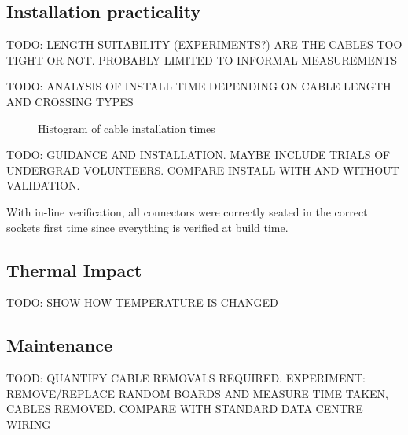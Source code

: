 		\subsection{Installation practicality}
			
			TODO: LENGTH SUITABILITY (EXPERIMENTS?) ARE THE CABLES TOO TIGHT OR NOT.
			PROBABLY LIMITED TO INFORMAL MEASUREMENTS
			
			TODO: ANALYSIS OF INSTALL TIME DEPENDING ON CABLE LENGTH AND CROSSING
			TYPES
			\begin{figure}
				
				\caption{Histogram of cable installation times}
			\end{figure}
			
			TODO: GUIDANCE AND INSTALLATION. MAYBE INCLUDE TRIALS OF UNDERGRAD
			VOLUNTEERS. COMPARE INSTALL WITH AND WITHOUT VALIDATION.
			
			With in-line verification, all connectors were correctly seated in the
			correct sockets first time since everything is verified at build time.
		
		\subsection{Thermal Impact}
			
			TODO: SHOW HOW TEMPERATURE IS CHANGED
			
		\subsection{Maintenance}
			
			TOOD: QUANTIFY CABLE REMOVALS REQUIRED. EXPERIMENT: REMOVE/REPLACE RANDOM
			BOARDS AND MEASURE TIME TAKEN, CABLES REMOVED. COMPARE WITH STANDARD DATA
			CENTRE WIRING

